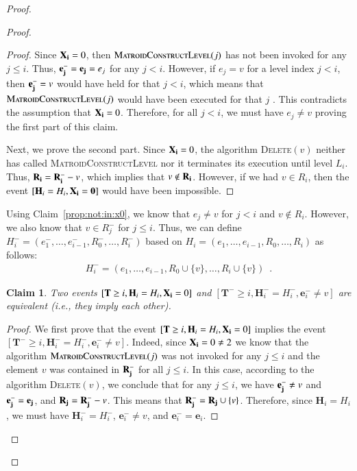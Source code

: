 \documentclass[11pt]{article}
\newtheorem{claim}{Claim}[section]
\newcommand{\MatroidConstLevel}{\textsc{MatroidConstructLevel}}
\newcommand{\deletev}{{\textsc{Delete}}}
\newcommand{\bE}{\ensuremath{\mathbf{e}}}
\newcommand{\bT}{\ensuremath{\mathbf{T}}}
\newcommand{\bH}{\ensuremath{\mathbf{H}}}
\begin{document}
\begin{proof}
\begin{proof}
\begin{proof}


Since $\bold{X_i}=0$, then $\MatroidConstLevel{}(j)$ has not been invoked for any $j \le i$. 
Thus, $\bold{e_j^-} = \bold{e_j} = e_j$ for any $j < i$. 
However, if $e_j = v$ for a level index $j < i$, then $\bold{e_j^-} = v$ would have held for that $j < i$, 
which means that $\MatroidConstLevel{}(j)$ would have been executed for that $j$ . 
This contradicts the assumption that $\bold{X_i}=0$. 
Therefore, for all $j < i$, we must have  $e_j \ne v$ proving the first part of this claim.  

Next, we prove the second part. 
Since $\bold{X_i} = 0$, the algorithm \deletev$(v)$ neither has called \MatroidConstLevel{} nor it terminates its execution until level $L_i$. 
Thus, $\bold{R_i} = \bold{R_i^-} - v$, which implies that $v \notin \bold{R_i}$. 
However, if we had $v \in R_i$, then the event $[\bH_i = H_i, \bold{X_i = 0}]$ would have been impossible.
\end{proof}


Using Claim~\ref{prop:not:in:x0}, 
we know that $e_j \ne v$ for $j < i$ and $v \notin R_i$. 
However, we also know that $v \in R_j^-$ for $j \le i$. 
Thus, we can define $H_i^- = (e_1^-, \dots, e_{i-1}^-, R_0^-  , \dots, R_i^- )$ 
based on $H_i = (e_1, \dots, e_{i-1}, R_0  , \dots, R_i)$ as follows:
\begin{align*}
    H_i^- =     (e_1, \dots, e_{i-1}, R_0 \cup \{v\} , \dots, R_i \cup \{v\}) \enspace. 
\end{align*}




\begin{claim}
    \label{pro:events:eqn}
   Two events $[\bT \geq i, \bH_i = H_i, \bold{X_i} = 0]$ and $[\bT^- \geq i, \bH_i^- = H_i^-, \bE_i^- \neq v]$ are equivalent (i.e., they imply each other).
\end{claim}

\begin{proof}
We first prove that the event $[\bT \geq i, \bH_i = H_i, \bold{X_i} = 0]$ 
implies the event $[\bT^- \geq i, \bH_i^- = H_i^-,\bE_i^- \neq v]$. 
Indeed, since $\bold{X_i}=0 \ne 2$ we know that  
the algorithm $\MatroidConstLevel{}(j)$ was not invoked for any $j \le i$ and 
the element $v$ was contained in $\bold{R_j^-}$ for all $j \le i$. 
In this case, according to the algorithm \deletev$(v)$, 
we conclude that for any $j \le i$, we have $\bold{e_j^-} \ne v $ and  $\bold{e_j^-} = \bold{e_j}$, and $\bold{R_j} = \bold{R_j^-} - v$.
This means that $\bold{R_j^-} = \bold{R_j} \cup \{v\}$. 
Therefore, since $\bH_i = H_i$, 
we must have  $\bH_i^- = H_i^-$, $\bE_i^- \neq v$, and  $\bE_i^-=\bE_i$.


\end{proof}
\end{proof}
\end{proof}
\end{document}
